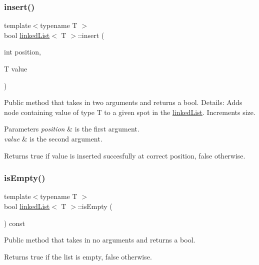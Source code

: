 \subsubsection{\texorpdfstring{insert()}{insert()}}
{\footnotesize\ttfamily template$<$typename T $>$ \\
bool \hyperlink{classlinked_list}{linked\+List}$<$ T $>$\+::insert (\begin{DoxyParamCaption}\item[{int}]{position,  }\item[{T}]{value }\end{DoxyParamCaption})}

Public method that takes in two arguments and returns a bool. Details\+: Adds node containing value of type T to a given spot in the \hyperlink{classlinked_list}{linked\+List}. Increments size. 
\begin{DoxyParams}{Parameters}
{\em position} & is the first argument. \\
\hline
{\em value} & is the second argument. \\
\hline
\end{DoxyParams}
\begin{DoxyReturn}{Returns}
true if value is inserted succesfully at correct position, false otherwise. 
\end{DoxyReturn}
\mbox{\label{classlinked_list_a50bf51fe7736a2dcb925a6959b7d9b16}} 
\subsubsection{\texorpdfstring{is\+Empty()}{isEmpty()}}
{\footnotesize\ttfamily template$<$typename T $>$ \\
bool \hyperlink{classlinked_list}{linked\+List}$<$ T $>$\+::is\+Empty (\begin{DoxyParamCaption}{ }\end{DoxyParamCaption}) const}

Public method that takes in no arguments and returns a bool. \begin{DoxyReturn}{Returns}
true if the list is empty, false otherwise. 
\end{DoxyReturn}
\mbox{\label{classlinked_list_ab2352d0baa1972fc01643a5ff27fe0ae}} 
